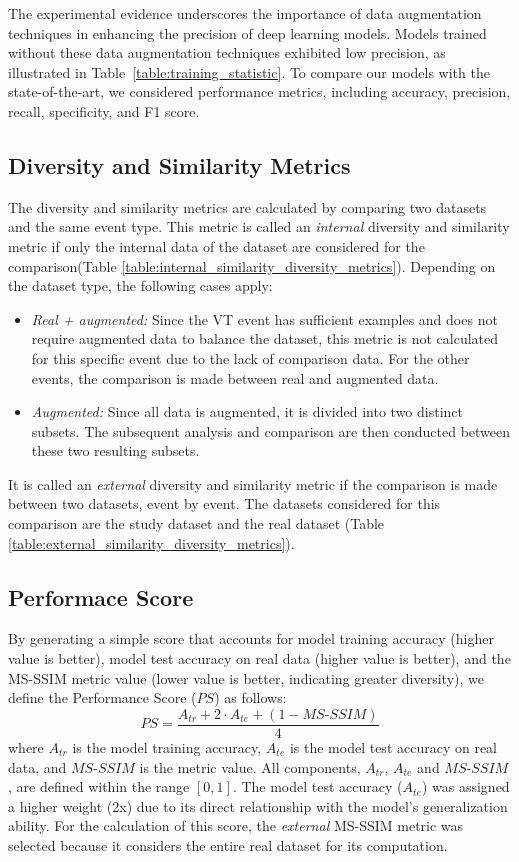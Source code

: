 \documentclass[lettersize,journal]{IEEEtran}
\begin{document}
The experimental evidence underscores the importance of data augmentation techniques in enhancing the precision of deep learning models. Models trained without these data augmentation techniques exhibited low precision, as illustrated in Table~\ref{table:training_statistic}.
To compare our models with the state-of-the-art, we considered performance metrics, including accuracy, precision, recall, specificity, and F1 score.\\

\subsection{Diversity and Similarity Metrics}
\noindent The diversity and similarity metrics are calculated by comparing two datasets and the same event type. This metric is called an \textit{internal} diversity and similarity metric if only the internal data of the dataset are considered for the comparison(Table \ref{table:internal_similarity_diversity_metrics}). Depending on the dataset type, the following cases apply:
\begin{itemize}
\item \textit{Real + augmented:} Since the VT event has sufficient examples and does not require augmented data to balance the dataset, this metric is not calculated for this specific event due to the lack of comparison data. For the other events, the comparison is made between real and augmented data.
\item \textit{Augmented:} Since all data is augmented, it is divided into two distinct subsets. The subsequent analysis and comparison are then conducted between these two resulting subsets.
\end{itemize}
It is called an \textit{external} diversity and similarity metric if the comparison is made between two datasets, event by event. The datasets considered for this comparison are the study dataset and the real dataset (Table \ref{table:external_similarity_diversity_metrics}).

\subsection{Performace Score}
\noindent By generating a simple score that accounts for model training accuracy (higher value is better), model test accuracy on real data (higher value is better), and the MS-SSIM metric value (lower value is better, indicating greater diversity), we define the Performance Score ($PS$) as follows:
\begin{equation}
\label{eq_ps}
PS = \frac{A_{tr}+2\cdot A_{te}+(1 - MS\text{-}SSIM)}{4}
\end{equation}
where $A_{tr}$ is the model training accuracy, $A_{te}$ is the model test accuracy on real data, and $MS\text{-}SSIM$ is the metric value. All components, $A_{tr}$, $A_{te}$ and $MS\text{-}SSIM$, are defined within the range $\left[0, 1\right]$. The model test accuracy ($A_{te}$) was assigned a higher weight (2x) due to its direct relationship with the model's generalization ability. For the calculation of this score, the \textit{external} MS-SSIM metric was selected because it considers the entire real dataset for its computation.
\end{document}
